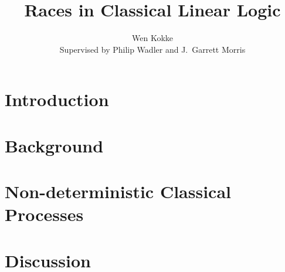 \documentclass[12pt,a4paper,UKenglish,mscres,logo,twoside,plainprepages,notimes,lfcs]{infthesis}
\title{Races in Classical Linear Logic}
\author{%
  Wen Kokke\\
  Supervised by Philip Wadler and J.\ Garrett Morris}
\date{}
\begin{document}
\maketitle

\chapter{Introduction}\label{sec:introduction}

\chapter{Background}\label{sec:background}






















\chapter{Non-deterministic Classical Processes}\label{sec:main}






















\chapter{Discussion}\label{sec:discussion}

\cite{wadler2012}
\printbibliography
\end{document}
